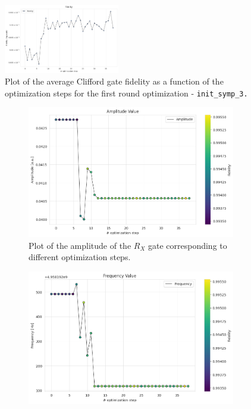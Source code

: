 \begin{figure}
    \centering
    \includegraphics[width=0.45\textwidth]{figures/png/RB_optimization/NM/InitialSymplex/20241113_200745/fidelity.png}
    \caption{Plot of the average Clifford gate fidelity as a function of the optimization steps for the first round optimization - \tt{init\_symp\_3}.}
    \label{fig:20241113_200745:fidelity}
\end{figure}

\begin{figure}[htbp]
    \centering
    \begin{subfigure}[t]{0.45\textwidth}
        \includegraphics[width=\textwidth]{figures/png/RB_optimization/NM/InitialSymplex/20241113_200745/Amplitude.png}
        \caption{Plot of the amplitude of the $R_X$ gate corresponding to different optimization steps.}
        \label{fig:20241113_200745:amplitude}
    \end{subfigure}
    \hfill
    \begin{subfigure}[t]{0.45\textwidth}
        \includegraphics[width=\textwidth]{figures/png/RB_optimization/NM/InitialSymplex/20241113_200745/Frequency.png}

\end{subfigure}
\end{figure}
